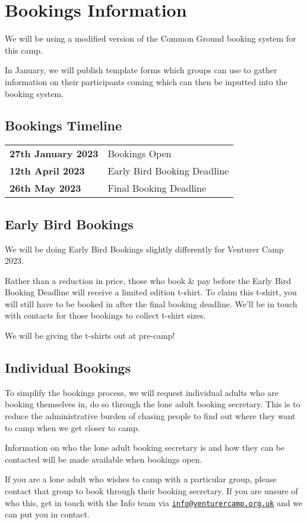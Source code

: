 \documentclass[a4paper, 10pt]{report}
\begin{document}
\chapter{Bookings Information}
We will be using a modified version of the Common Ground booking system for this camp.

In January, we will publish template forms which groups can use to gather information on their participants coming which can then be inputted into the booking system.
\section{Bookings Timeline}
\begin{table}[H]
    \centering
\begin{tabularx}{\textwidth}{ll}
    \textbf{27th January 2023} & Bookings Open \\
    \textbf{12th April 2023} & Early Bird Booking Deadline \\
    \textbf{26th May 2023} & Final Booking Deadline
\end{tabularx}
\end{table}
\section{Early Bird Bookings}
We will be doing Early Bird Bookings slightly differently for Venturer Camp 2023.

Rather than a reduction in price, those who book \& pay before the Early Bird Booking Deadline will receive a limited edition t-shirt. To claim this t-shirt, you will still have to be booked in after the final booking deadline. We'll be in touch with contacts for those bookings to collect t-shirt sizes. 

We will be giving the t-shirts out at pre-camp!
\section{Individual Bookings}
To simplify the bookings process, we will request individual adults who are booking themselves in, do so through the lone adult booking secretary. This is to reduce the administrative burden of chasing people to find out where they want to camp when we get closer to camp.

Information on who the lone adult booking secretary is and how they can be contacted will be made available when bookings open.

If you are a lone adult who wishes to camp with a particular group, please contact that group to book through their booking secretary. If you are unsure of who this, get in touch with the Info team via \href{mailto:info@venturercamp.org.uk}{\texttt{info@venturercamp.org.uk}} and we can put you in contact.
\end{document}
